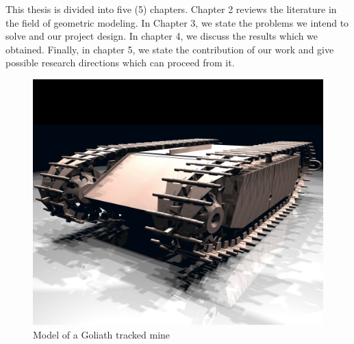 This thesis is divided into five (5) chapters. Chapter 2 reviews the literature in the field of geometric modeling. In Chapter 3, we state the problems we intend to solve and our project design. In chapter 4, we discuss the results which we obtained. Finally, in
chapter 5, we state the contribution of our work and give possible research directions which can proceed from it.


\begin{figure}[htbp]
\centering
\includegraphics[trim=1cm 2cm 3cm 4cm, clip=true, totalheight=0.5\textheight]{Figures/Goliath.png}
\caption[Model of a Goliath tracked mine]{Model of a Goliath tracked mine}
\label{Goliath}
\end{figure}

